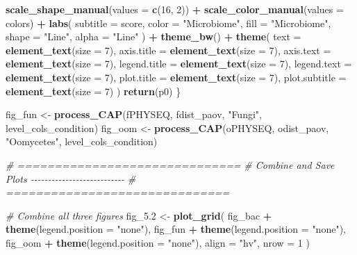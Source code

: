 \documentclass[
  11pt,
]{article}
\newenvironment{Shaded}{\begin{snugshade}}{\end{snugshade}}
\newcommand{\AttributeTok}[1]{\textcolor[rgb]{0.13,0.29,0.53}{#1}}
\newcommand{\CommentTok}[1]{\textcolor[rgb]{0.56,0.35,0.01}{\textit{#1}}}
\newcommand{\DecValTok}[1]{\textcolor[rgb]{0.00,0.00,0.81}{#1}}
\newcommand{\FloatTok}[1]{\textcolor[rgb]{0.00,0.00,0.81}{#1}}
\newcommand{\FunctionTok}[1]{\textcolor[rgb]{0.13,0.29,0.53}{\textbf{#1}}}
\newcommand{\NormalTok}[1]{#1}
\newcommand{\OtherTok}[1]{\textcolor[rgb]{0.56,0.35,0.01}{#1}}
\newcommand{\SpecialCharTok}[1]{\textcolor[rgb]{0.81,0.36,0.00}{\textbf{#1}}}
\newcommand{\StringTok}[1]{\textcolor[rgb]{0.31,0.60,0.02}{#1}}
\begin{document}
\begin{Shaded}
\begin{Highlighting}[]
    \FunctionTok{scale\_shape\_manual}\NormalTok{(}\AttributeTok{values =} \FunctionTok{c}\NormalTok{(}\DecValTok{16}\NormalTok{, }\DecValTok{2}\NormalTok{)) }\SpecialCharTok{+}
    \FunctionTok{scale\_color\_manual}\NormalTok{(}\AttributeTok{values =}\NormalTok{ colors) }\SpecialCharTok{+}
    \FunctionTok{labs}\NormalTok{(}
      \AttributeTok{subtitle =}\NormalTok{ score,}
      \AttributeTok{color =} \StringTok{"Microbiome"}\NormalTok{, }\AttributeTok{fill =} \StringTok{"Microbiome"}\NormalTok{, }
      \AttributeTok{shape =} \StringTok{"Line"}\NormalTok{, }\AttributeTok{alpha =} \StringTok{"Line"}
\NormalTok{    ) }\SpecialCharTok{+}
    \FunctionTok{theme\_bw}\NormalTok{() }\SpecialCharTok{+}
    \FunctionTok{theme}\NormalTok{(}
      \AttributeTok{text =} \FunctionTok{element\_text}\NormalTok{(}\AttributeTok{size =} \DecValTok{7}\NormalTok{),}
      \AttributeTok{axis.title =} \FunctionTok{element\_text}\NormalTok{(}\AttributeTok{size =} \DecValTok{7}\NormalTok{),}
      \AttributeTok{axis.text =} \FunctionTok{element\_text}\NormalTok{(}\AttributeTok{size =} \DecValTok{7}\NormalTok{),}
      \AttributeTok{legend.title =} \FunctionTok{element\_text}\NormalTok{(}\AttributeTok{size =} \DecValTok{7}\NormalTok{),}
      \AttributeTok{legend.text =} \FunctionTok{element\_text}\NormalTok{(}\AttributeTok{size =} \DecValTok{7}\NormalTok{),}
      \AttributeTok{plot.title =} \FunctionTok{element\_text}\NormalTok{(}\AttributeTok{size =} \DecValTok{7}\NormalTok{),}
      \AttributeTok{plot.subtitle =} \FunctionTok{element\_text}\NormalTok{(}\AttributeTok{size =} \DecValTok{7}\NormalTok{)}
\NormalTok{    )}
  \FunctionTok{return}\NormalTok{(p0)}
\NormalTok{\}}

\NormalTok{fig\_fun }\OtherTok{\textless{}{-}} \FunctionTok{process\_CAP}\NormalTok{(fPHYSEQ, fdist\_paov, }\StringTok{"Fungi"}\NormalTok{, level\_cols\_condition)}
\NormalTok{fig\_oom }\OtherTok{\textless{}{-}} \FunctionTok{process\_CAP}\NormalTok{(oPHYSEQ, odist\_paov, }\StringTok{"Oomycetes"}\NormalTok{, level\_cols\_condition)}

\CommentTok{\# ==============================}
\CommentTok{\# Combine and Save Plots {-}{-}{-}{-}{-}{-}{-}{-}{-}{-}{-}{-}{-}{-}{-}{-}{-}{-}{-}{-}{-}{-}{-}{-}{-}{-}{-}}
\CommentTok{\# ==============================}

\CommentTok{\# Combine all three figures}
\NormalTok{fig\_5}\FloatTok{.2} \OtherTok{\textless{}{-}} \FunctionTok{plot\_grid}\NormalTok{(}
\NormalTok{  fig\_bac }\SpecialCharTok{+} \FunctionTok{theme}\NormalTok{(}\AttributeTok{legend.position =} \StringTok{"none"}\NormalTok{),}
\NormalTok{  fig\_fun }\SpecialCharTok{+} \FunctionTok{theme}\NormalTok{(}\AttributeTok{legend.position =} \StringTok{"none"}\NormalTok{),}
\NormalTok{  fig\_oom }\SpecialCharTok{+} \FunctionTok{theme}\NormalTok{(}\AttributeTok{legend.position =} \StringTok{"none"}\NormalTok{),}
  \AttributeTok{align =} \StringTok{"hv"}\NormalTok{, }
  \AttributeTok{nrow =} \DecValTok{1}
\NormalTok{)}


\end{Highlighting}
\end{Shaded}
\end{document}
